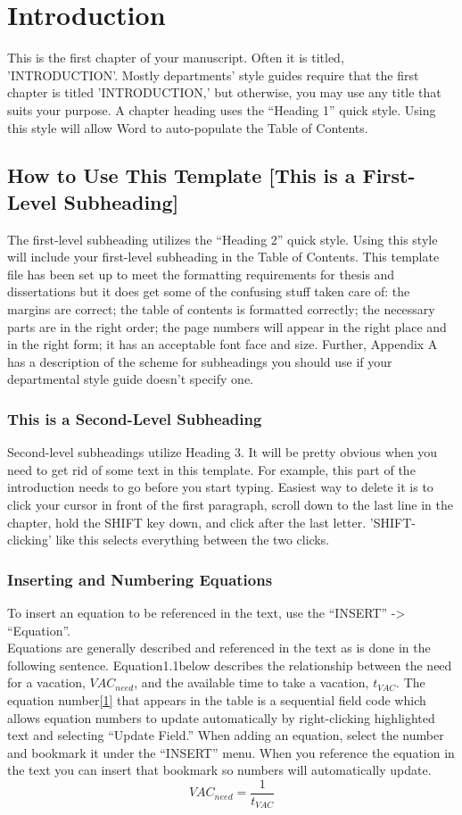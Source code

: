 \documentclass[a4paper,12pt,one side]{report}
\theoremstyle{definition}
\begin{document}
\chapter{Introduction}
\begin{justify}
This is the first chapter of your manuscript. Often it is titled, 'INTRODUCTION'. Mostly departments’ style guides require that the first chapter is titled 'INTRODUCTION,' but otherwise, you may use any title that suits your purpose. A chapter heading uses the “Heading 1” quick style.  Using this style will allow Word to auto-populate the Table of Contents.
\section{How to Use This Template [This is a First-Level Subheading]}
The first-level subheading utilizes the “Heading 2” quick style.  Using this style will include your first-level subheading in the Table of Contents. This template file has been set up to meet the formatting requirements for thesis and dissertations but it does get some of the confusing stuff taken care of: the margins are correct; the table of contents is formatted correctly; the necessary parts are in the right order; the page numbers will appear in the right place and in the right form; it has an acceptable font face and size. Further, Appendix A has a description of the scheme for subheadings you should use if your departmental style guide doesn't specify one.
\subsection{This is a Second-Level Subheading}
Second-level subheadings utilize Heading 3.  It will be pretty obvious when you need to get rid of some text in this template. For example, this part of the introduction needs to go before you start typing. Easiest way to delete it is to click your cursor in front of the first paragraph, scroll down to the last line in the chapter, hold the SHIFT key down, and click after the last letter. 'SHIFT-clicking' like this selects everything between the two clicks.
\subsection{Inserting and Numbering Equations}
To insert an equation to be referenced in the text, use the “INSERT” ->  “Equation”.\\
Equations are generally described and referenced in the text as is done in the following sentence.  Equation1.1below describes the relationship between the need for a vacation, $VAC_{need}$, and the available time to take a vacation, $t_{VAC}$.  The equation number\eqref{1} that appears in the table is a sequential field code which allows equation numbers to update automatically by right-clicking highlighted text and selecting “Update Field.”  When adding an equation, select the number and bookmark it under the “INSERT” menu.  When you reference the equation in the text you can insert that bookmark so numbers will automatically update.
\begin{equation}\label{1}
    VAC_{need}=\frac{1}{t_{VAC}}
\end{equation}

\end{justify}
\end{document}
